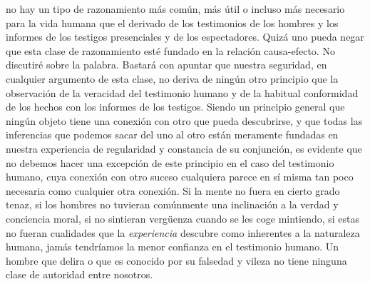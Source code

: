 {no hay un tipo de razonamiento más común, más útil o incluso más necesario para la vida humana que el derivado de los testimonios de los hombres y los informes de los testigos presenciales y de los espectadores. Quizá uno pueda negar que esta clase de razonamiento esté fundado en la relación causa-efecto. No discutiré sobre la palabra. Bastará con apuntar que nuestra seguridad, en cualquier argumento de esta clase, no deriva de ningún otro principio que la observación de la veracidad del testimonio humano y de la habitual conformidad de los hechos con los informes de los testigos. Siendo un principio general que ningún objeto tiene una conexión con otro que pueda descubrirse, y que todas las inferencias que podemos sacar del uno al otro están meramente fundadas en nuestra experiencia de regularidad y constancia de su conjunción, es evidente que no debemos hacer una excepción de este principio en el caso del testimonio humano, cuya conexión con otro suceso cualquiera parece en sí misma tan poco necesaria como cualquier otra conexión. Si la mente no fuera en cierto grado tenaz, si los hombres no tuvieran comúnmente una inclinación a la verdad y conciencia moral, si no sintieran vergüenza cuando se les coge mintiendo, si estas no fueran cualidades que la \emph{experiencia} descubre como inherentes a la naturaleza humana, jamás tendríamos la menor confianza en el testimonio humano. Un hombre que delira o que es conocido por su falsedad y vileza no tiene ninguna clase de autoridad entre nosotros}.

